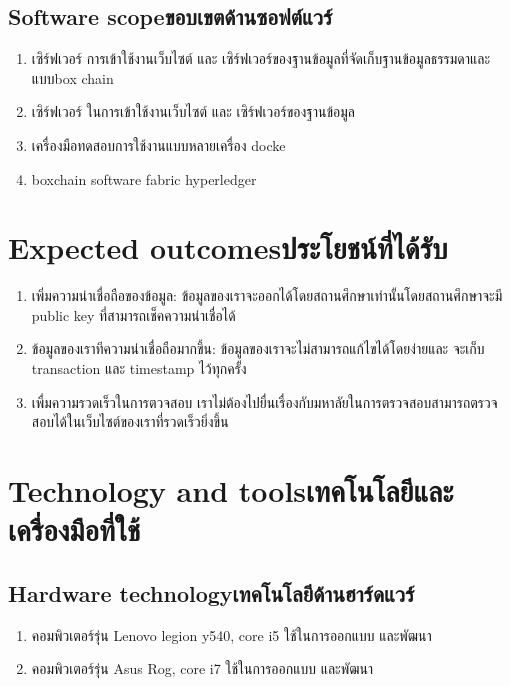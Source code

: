 \subsection{\ifenglish Software scope\else ขอบเขตด้านซอฟต์แวร์\fi}
\begin{enumerate}
    \item เซิร์ฟเวอร์ การเข้าใช้งานเว็บไซต์ และ เซิร์ฟเวอร์ของฐานข้อมูลที่จัดเก็บฐานข้อมูลธรรมดาและแบบbox chain
    \item เซิร์ฟเวอร์ ในการเข้าใช้งานเว็บไซต์ และ เซิร์ฟเวอร์ของฐานข้อมูล
    \item เครื่องมือทดสอบการใช้งานแบบหลายเครื่อง docke
    \item boxchain software fabric hyperledger
\end{enumerate}
\section{\ifenglish Expected outcomes\else ประโยชน์ที่ได้รับ\fi}
\begin{enumerate}
    \item เพิ่มความน่าเชื่อถือของข้อมูล: ข้อมูลของเราจะออกได้โดยสถานศึกษาเท่านั้นโดยสถานศึกษาจะมี
     public key ที่สามารถเช็คความน่าเชื่อได้
    \item ข้อมูลของเราทีความน่าเชื่อถือมากขึ้น: ข้อมูลของเราจะไม่สามารถแก้ไขได้โดยง่ายและ
    จะเก็บ transaction และ timestamp ไว้ทุกครั้ง
    \item เพื่มความรวดเร็วในการตวจสอบ เราไม่ต้องไปยื่นเรื่องกับมหาลัยในการตรวจสอบสามารถตรวจสอบได้ในเว็บไซต์ของเราที่รวดเร็วยิ่งขึ้น
\end{enumerate}
\section{\ifenglish Technology and tools\else เทคโนโลยีและเครื่องมือที่ใช้\fi}

\subsection{\ifenglish Hardware technology\else เทคโนโลยีด้านฮาร์ดแวร์\fi}
\begin{enumerate}
    \item คอมพิวเตอร์รุ่น Lenovo legion y540, core i5  ใช้ในการออกแบบ และพัฒนา
    \item คอมพิวเตอร์รุ่น Asus Rog, core i7 ใช้ในการออกแบบ และพัฒนา
\end{enumerate}

